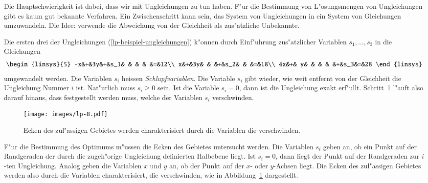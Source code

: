 Die Hauptschwierigkeit ist dabei, dass wir mit Ungleichungen zu tun
haben.
F"ur die Bestimmung von L"osungsmengen von Ungleichungen gibt
es kaum gut bekannte Verfahren.
Ein Zwischenschritt kann sein, das System von Ungleichungen in
ein System von Gleichungen umzuwandeln.
Die Idee: verwende die Abweichung von der Gleichheit als zus"atzliche
Unbekannte.

Die ersten drei der Ungleichungen (\ref{lp-beispiel-ungleichungen})
k"onnen durch
Einf"uhrung zus"atzlicher Variablen $s_1,\dots,s_3$ in die Gleichungen
\begin{equation}
\begin{linsys}{5}
-x&+&3y&+&s_1& &   & &   &=&12\\
 x&+&3y& &   &+&s_2& &   &=&18\\
4x&+& y& &   & &   &+&s_3&=&28
\end{linsys}
\label{lp-ungleichungen-schlupf}
\end{equation}
umgewandelt werden.
Die Variablen $s_i$ heissen {\em Schlupfvariablen}.
Die Variable $s_i$ gibt wieder, wie weit entfernt von der Gleichheit
die Ungleichung Nummer $i$ ist.
Nat"urlich muss $s_i\ge 0$ sein.
Ist die Variable $s_i=0$, dann ist die Ungleichung exakt erf"ullt.
Schritt~1 l"auft also darauf hinaus, dass festgestellt werden muss,
welche der Variablen $s_i$ verschwinden.

\begin{figure}
\begin{center}
\texttt{[image: images/lp-8.pdf]}
\end{center}
\caption{Ecken des zul"assigen Gebietes werden charakterisiert durch
die Variablen die verschwinden.
\label{lp:corners}}
\end{figure}
F"ur die Bestimmung des Optimums m"ussen die Ecken des Gebietes 
untersucht werden. Die Variablen $s_i$ geben an, ob ein Punkt auf
der Randgeraden der durch die zugeh"orige Ungleichung definierten
Halbebene liegt.
Ist $s_i=0$, dann liegt der Punkt auf der Randgeraden zur $i$-ten Ungleichung.
Analog geben die Variablen $x$ und $y$ an, ob der Punkt auf der
$x$- oder $y$-Achsen liegt. Die Ecken des zul"assigen Gebietes
werden also durch die Variablen charakterisiert, die verschwinden,
wie in Abbildung~\ref{lp:corners} dargestellt.

